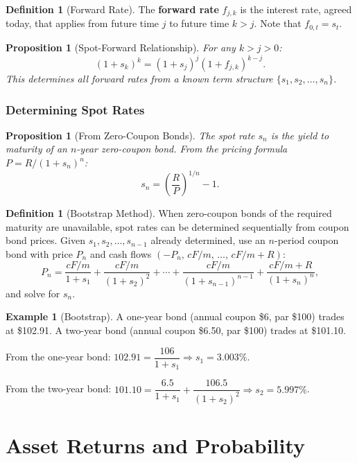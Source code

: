 \documentclass[12pt, a4paper]{article}
\theoremstyle{plain}
\newtheorem{proposition}[theorem]{Proposition}
\theoremstyle{definition}
\newtheorem{definition}[theorem]{Definition}
\newtheorem{example}[theorem]{Example}
\theoremstyle{remark}
\begin{document}
\begin{definition}[Forward Rate]
  The \textbf{forward rate} $f_{j,k}$ is the interest rate, agreed today, that applies from future time $j$ to future time $k > j$. Note that $f_{0,t} = s_t$.
\end{definition}

\begin{proposition}[Spot-Forward Relationship]
  For any $k > j > 0$:
  \[
    (1 + s_k)^k = (1 + s_j)^j (1 + f_{j,k})^{k-j}.
  \]
  This determines all forward rates from a known term structure $\{s_1, s_2, \ldots, s_n\}$.
\end{proposition}

\subsubsection{Determining Spot Rates}

\begin{proposition}[From Zero-Coupon Bonds]
  The spot rate $s_n$ is the yield to maturity of an $n$-year zero-coupon bond. From the pricing formula $P = R/(1+s_n)^n$:
  \[
    s_n = \left(\frac{R}{P}\right)^{1/n} - 1.
  \]
\end{proposition}

\begin{definition}[Bootstrap Method]
  When zero-coupon bonds of the required maturity are unavailable, spot rates can be determined sequentially from coupon bond prices. Given $s_1, s_2, \ldots, s_{n-1}$ already determined, use an $n$-period coupon bond with price $P_n$ and cash flows $(-P_n,\, cF/m,\, \ldots,\, cF/m + R)$:
  \[
    P_n = \frac{cF/m}{1+s_1} + \frac{cF/m}{(1+s_2)^2} + \cdots + \frac{cF/m}{(1+s_{n-1})^{n-1}} + \frac{cF/m + R}{(1+s_n)^n},
  \]
  and solve for $s_n$.
\end{definition}

\begin{example}[Bootstrap]
  A one-year bond (annual coupon \$6, par \$100) trades at \$102.91. A two-year bond (annual coupon \$6.50, par \$100) trades at \$101.10.

  From the one-year bond: $102.91 = \dfrac{106}{1+s_1} \Rightarrow s_1 = 3.003\%$.

  From the two-year bond: $101.10 = \dfrac{6.5}{1+s_1} + \dfrac{106.5}{(1+s_2)^2} \Rightarrow s_2 = 5.997\%$.
\end{example}



\pagebreak
\section{Asset Returns and Probability}
\end{document}
